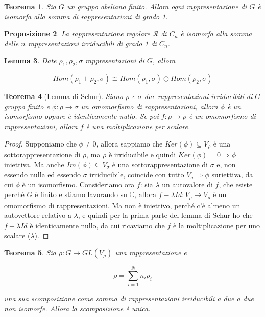 \documentclass[11pt]{article}
\theoremstyle{plain}
\newtheorem{thm}{Teorema}[section]
\newtheorem{lemma}[thm]{Lemma}
\newtheorem{prop}[thm]{Proposizione}
\theoremstyle{definition}
\theoremstyle{remark}
\newcommand{\C}{\mathbb{C}}
\newcommand{\dsum}{\displaystyle\sum}
\begin{document}
\begin{thm}Sia $G$ un gruppo abeliano finito. Allora ogni rappresentazione di $G$ è isomorfa alla somma di rappresentazioni di grado 1.



\end{thm}


\begin{prop} La rappresentazione regolare $\mathcal{R}$ di $C_n$ è isomorfa alla somma delle $n$ rappresentazioni irriducibili di grado 1 di $C_n$.

\end{prop}


\begin{lemma}
Date $\rho_1, \rho_2, \sigma$ rappresentazioni di $G$, allora

\[Hom(\rho_1 + \rho_2, \sigma) \cong Hom(\rho_1, \sigma) \oplus Hom(\rho_2, \sigma)\]

\end{lemma}


\begin{thm}[Lemma di Schur]
Siano $\rho$ e $\sigma$ due rappresentazioni irriducibili di $G$ gruppo finito e $\phi:\rho\to\sigma$ un omomorfismo di rappresentazioni, allora $\phi$ è un isomorfismo oppure è identicamente nullo. Se poi $f:\rho\to\rho$ è un omomorfismo di rappresentazioni, allora $f$ è una moltiplicazione per scalare.
\end{thm}
\begin{proof}
Supponiamo che $\phi\neq0$, allora sappiamo che $Ker(\phi)\subseteq V_\rho$ è una sottorappresentazione di $\rho$, ma $\rho$ è irriducibile e quindi $Ker(\phi)=0\Rightarrow \phi$ iniettiva. Ma anche $Im(\phi)\subseteq V_{\sigma}$ è una sottorappresentazione di $\sigma$ e, non essendo nulla ed essendo $\sigma$ irriducibile, coincide con tutto $V_\sigma \Rightarrow \phi$ suriettiva, da cui $\phi$ è un isomorfismo.
Consideriamo ora $f$: sia $\lambda$ un autovalore di $f$, che esiste perché $G$ è finito e stiamo lavorando su $\C$, allora $f-\lambda Id:V_\rho\to V_\rho$ è un omomorfismo di rappresentazioni. Ma non è iniettivo, perché c'è almeno un autovettore relativo a $\lambda$, e quindi per la prima parte del lemma di Schur ho che $f-\lambda Id$ è identicamente nullo, da cui ricaviamo che $f$ è la moltiplicazione per uno scalare ($\lambda$).
\end{proof}


\begin{thm}
Sia $\rho: G \to GL(V_\rho)$ una rappresentazione e 

\[\rho = \dsum_{i=1}^N n_i \rho_i \]

una sua scomposizione come somma di rappresentazioni irriducibili a due a due non isomorfe. Allora la scomposizione è unica.
\end{thm}
\end{document}

